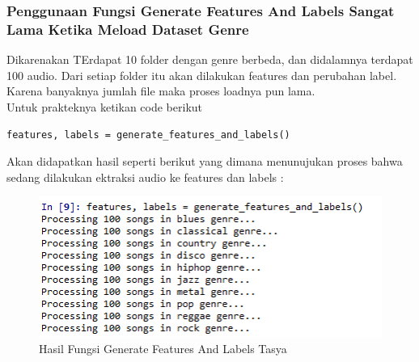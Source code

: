 \subsubsection{Penggunaan Fungsi Generate Features And Labels Sangat Lama Ketika Meload Dataset Genre}
\par Dikarenakan TErdapat 10 folder dengan genre berbeda, dan didalamnya terdapat 100 audio. Dari setiap folder itu akan dilakukan features dan perubahan label. Karena banyaknya jumlah file maka proses loadnya pun lama.\\
Untuk prakteknya ketikan code berikut 
\begin{verbatim}
features, labels = generate_features_and_labels()
\end{verbatim}
Akan didapatkan hasil seperti berikut yang dimana menunujukan proses bahwa sedang dilakukan ektraksi audio ke features dan labels :
\begin{figure}[ht]
\centering
\includegraphics[scale=0.5]{figures/chapter6tasya11.png}
\caption{Hasil Fungsi Generate Features And Labels Tasya}
\label{Praktek}
\end{figure}

